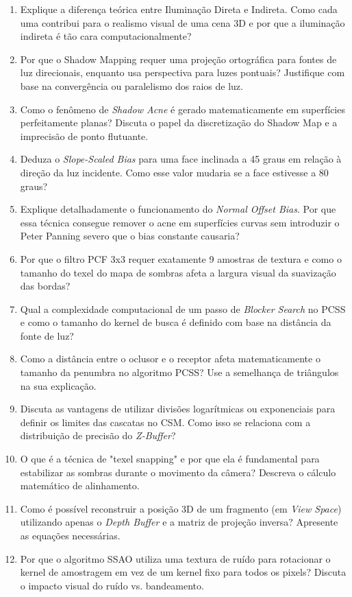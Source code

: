 \begin{enumerate}
    \item Explique a diferença teórica entre Iluminação Direta e Indireta. Como cada uma contribui para o realismo visual de uma cena 3D e por que a iluminação indireta é tão cara computacionalmente?
    \item Por que o Shadow Mapping requer uma projeção ortográfica para fontes de luz direcionais, enquanto usa perspectiva para luzes pontuais? Justifique com base na convergência ou paralelismo dos raios de luz.
    \item Como o fenômeno de \textit{Shadow Acne} é gerado matematicamente em superfícies perfeitamente planas? Discuta o papel da discretização do Shadow Map e a imprecisão de ponto flutuante.
    \item Deduza o \textit{Slope-Scaled Bias} para uma face inclinada a 45 graus em relação à direção da luz incidente. Como esse valor mudaria se a face estivesse a 80 graus?
    \item Explique detalhadamente o funcionamento do \textit{Normal Offset Bias}. Por que essa técnica consegue remover o acne em superfícies curvas sem introduzir o Peter Panning severo que o bias constante causaria?
    \item Por que o filtro PCF 3x3 requer exatamente 9 amostras de textura e como o tamanho do texel do mapa de sombras afeta a largura visual da suavização das bordas?
    \item Qual a complexidade computacional de um passo de \textit{Blocker Search} no PCSS e como o tamanho do kernel de busca é definido com base na distância da fonte de luz?
    \item Como a distância entre o oclusor e o receptor afeta matematicamente o tamanho da penumbra no algoritmo PCSS? Use a semelhança de triângulos na sua explicação.
    \item Discuta as vantagens de utilizar divisões logarítmicas ou exponenciais para definir os limites das cascatas no CSM. Como isso se relaciona com a distribuição de precisão do \textit{Z-Buffer}?
    \item O que é a técnica de "texel snapping" e por que ela é fundamental para estabilizar as sombras durante o movimento da câmera? Descreva o cálculo matemático de alinhamento.
    \item Como é possível reconstruir a posição 3D de um fragmento (em \textit{View Space}) utilizando apenas o \textit{Depth Buffer} e a matriz de projeção inversa? Apresente as equações necessárias.
    \item Por que o algoritmo SSAO utiliza uma textura de ruído para rotacionar o kernel de amostragem em vez de um kernel fixo para todos os pixels? Discuta o impacto visual do ruído vs. bandeamento.

\end{enumerate}
